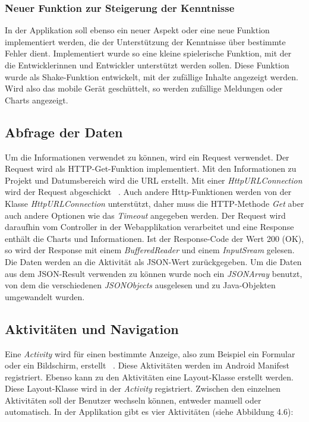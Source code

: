 \subsubsection{Neuer Funktion zur Steigerung der Kenntnisse}
In der Applikation soll ebenso ein neuer Aspekt oder eine neue Funktion implementiert werden, die der Unterstützung der Kenntnisse über bestimmte Fehler dient. Implementiert wurde so eine kleine spielerische Funktion, mit der die Entwicklerinnen und Entwickler unterstützt werden sollen. Diese Funktion wurde als Shake-Funktion entwickelt, mit der zufällige Inhalte angezeigt werden. Wird also das mobile Gerät geschüttelt, so werden zufällige Meldungen oder Charts angezeigt.
\subsection{Abfrage der Daten}
Um die Informationen verwendet zu können, wird ein Request verwendet. Der Request wird als HTTP-Get-Funktion implementiert. Mit den Informationen zu Projekt und Datumsbereich wird die URL erstellt. Mit einer \textit{HttpURLConnection} wird der Request abgeschickt ~\parencite{liu2017web}. Auch andere Http-Funktionen werden von der Klasse \textit{HttpURLConnection} unterstützt, daher muss die HTTP-Methode \textit{Get} aber auch andere Optionen wie das \textit{Timeout} angegeben werden. Der Request wird daraufhin vom Controller in der Webapplikation verarbeitet und eine Response enthält die Charts und Informationen. Ist der Response-Code der Wert 200 (OK), so wird der Response mit einem \textit{BufferedReader} und einem \textit{InputSream} gelesen. Die Daten werden an die Aktivität als JSON-Wert zurückgegeben. Um die Daten aus dem JSON-Result verwenden zu können wurde noch ein \textit{JSONArray} benutzt, von dem die verschiedenen \textit{JSONObjects} ausgelesen und zu Java-Objekten umgewandelt wurden. 
\subsection{Aktivitäten und Navigation}
Eine \textit{Activity} wird für einen bestimmte Anzeige, also zum Beispiel ein Formular oder ein Bildschirm, erstellt ~\parencite{mednieks2012programming}. Diese Aktivitäten werden im Android Manifest registriert. Ebenso kann zu den Aktivitäten eine Layout-Klasse erstellt werden. Diese Layout-Klasse wird in der \textit{Activity} registriert. Zwischen den einzelnen Aktivitäten soll der Benutzer wechseln können, entweder manuell oder automatisch. In der Applikation gibt es vier Aktivitäten (siehe Abbildung 4.6):
